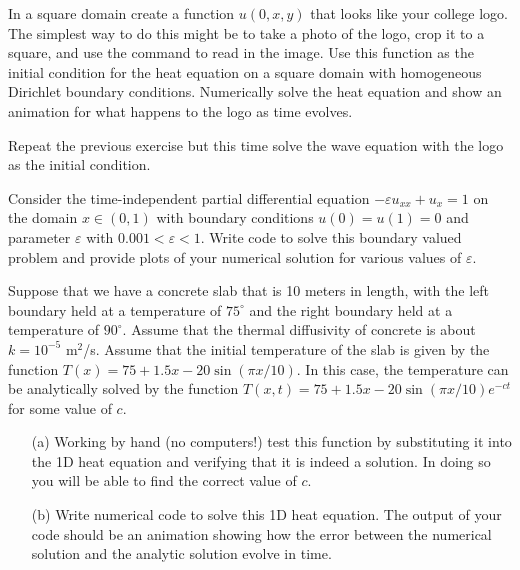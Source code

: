 \begin{problem}
    In a square domain create a function $u(0,x,y)$ that looks like your college logo.
    The simplest way to do this might be to take a photo of the logo, crop it to a square,
    and use the  command to read in the image.  Use this function as the
    initial condition for the heat equation on a square domain with homogeneous Dirichlet
    boundary conditions.  Numerically solve the heat equation and show an animation for
    what happens to the logo as time evolves.
\end{problem}

\begin{problem}
    Repeat the previous exercise but this time solve the wave equation with the logo as the
    initial condition.
\end{problem}






\begin{problem}
    Consider the time-independent partial differential equation $-\varepsilon u_{xx} +
    u_x = 1$ on the domain $x \in (0,1)$ with boundary conditions $u(0) = u(1) = 0$ and
    parameter $\varepsilon$ with $0.001<\varepsilon<1$.
    Write code to solve this boundary valued problem and provide plots of your numerical
    solution for various values of $\varepsilon$. 
\end{problem}


\begin{problem}
    Suppose that we have a concrete slab that is 10 meters in length, with the left
    boundary held at a temperature of $75^\circ$ and the right boundary held at a
    temperature of $90^\circ$.  Assume that the thermal diffusivity of concrete is about
    $k = 10^{-5}$ m$^2$/s.  Assume that the initial temperature of the slab is given by
    the function $T(x) = 75 + 1.5x - 20 \sin( \pi x / 10)$.  In this case, the temperature
    can be analytically solved by the function $T(x,t) = 75 + 1.5x - 20 \sin(\pi x / 10)
    e^{-ct}$ for some value of $c$.  
    \begin{enumerate}
        \item[(a)] Working by hand (no computers!) test this function by substituting it
            into the 1D heat equation and verifying that it is indeed a solution.  In
            doing so you will be able to find the correct value of $c$.
        \item[(b)] Write numerical code to solve this 1D heat equation.  The output of
            your code should be an animation showing how the error between the numerical
            solution and the analytic solution evolve in time.
    \end{enumerate}
\end{problem}


